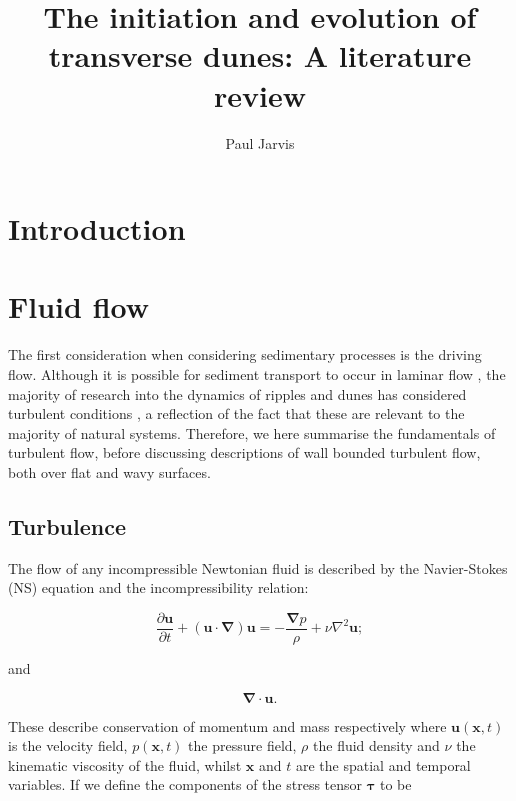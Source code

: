 \documentclass[12pt]{article}
\title{The initiation and evolution of transverse dunes: A literature review}
\date{}
\author{Paul Jarvis}
\begin{document}
\thispagestyle{empty}

\maketitle

\section{Introduction}
\label{sec:intro}

\section{Fluid flow}
\label{sec:fluid}

The first consideration when considering sedimentary processes is the driving flow. Although it is possible for sediment transport to occur in laminar flow \citep{Charru02, Charru04, Mouilleron09}, the majority of research into the dynamics of ripples and dunes has considered turbulent conditions \citep{Andreotti02, Kroy02, Langlois07, Wierschem08, Franklin11, Charru12, Andreotti12, Franklin15}, a reflection of the fact that these are relevant to the majority of natural systems. Therefore, we here summarise the fundamentals of turbulent flow, before discussing descriptions of wall bounded turbulent flow, both over flat and wavy surfaces.

\subsection{Turbulence}
\label{subsec:turb}

The flow of any incompressible Newtonian fluid is described by the Navier-Stokes (NS) equation and the incompressibility relation:

\begin{equation}
\label{equ:NS_equ}
\frac{\partial \boldsymbol{u}}{\partial t} + (\boldsymbol{u} \cdot \boldsymbol{\nabla}) \boldsymbol{u} = -\frac{\boldsymbol{\nabla} p}{\rho} + \nu \nabla^{2} \boldsymbol{u};
\end{equation}

and

\begin{equation}
\label{equ:cont}
\boldsymbol{\nabla} \cdot \boldsymbol{u}.
\end{equation}

These describe conservation of momentum and mass respectively where $\boldsymbol{u}(\boldsymbol{x},t)$ is the velocity field, $p(\boldsymbol{x},t)$ the pressure field, $\rho$ the fluid density and $\nu$ the kinematic viscosity of the fluid, whilst $\boldsymbol{x}$ and $t$ are the spatial and temporal variables. If we define the components of the stress tensor $\boldsymbol{\tau}$ to be
\end{document}
